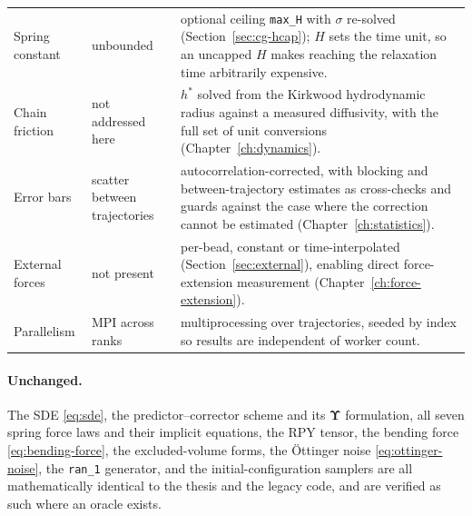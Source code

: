 \documentclass[11pt,a4paper]{report}
\newcommand{\code}[1]{\texttt{\seqsplitcode{#1}}}
\newcommand{\seqsplitcode}[1]{#1}
\begin{document}
\begin{longtable}{@{}p{}p{}p{}@{}}
\addlinespace
Spring constant
  & unbounded
  & optional ceiling \code{max\_H} with $\sigma$ re-solved
    (Section~\ref{sec:cg-hcap}); $H$ sets the time unit, so an uncapped $H$ makes
    reaching the relaxation time arbitrarily expensive. \\
\addlinespace
Chain friction
  & not addressed here
  & $h^{*}$ solved from the Kirkwood hydrodynamic radius against a measured
    diffusivity, with the full set of unit conversions
    (Chapter~\ref{ch:dynamics}). \\
\addlinespace
Error bars
  & scatter between trajectories
  & autocorrelation-corrected, with blocking and between-trajectory estimates as
    cross-checks and guards against the case where the correction cannot be
    estimated (Chapter~\ref{ch:statistics}). \\
\addlinespace
External forces
  & not present
  & per-bead, constant or time-interpolated (Section~\ref{sec:external}), enabling
    direct force-extension measurement (Chapter~\ref{ch:force-extension}). \\
\addlinespace
Parallelism
  & MPI across ranks
  & multiprocessing over trajectories, seeded by index so results are independent
    of worker count. \\
\bottomrule
\end{longtable}

\paragraph{Unchanged.} The SDE \eqref{eq:sde}, the predictor--corrector scheme
and its $\bm{\Upsilon}$ formulation, all seven spring force laws and their
implicit equations, the RPY tensor, the bending force
\eqref{eq:bending-force}, the excluded-volume forms, the \"{O}ttinger noise
\eqref{eq:ottinger-noise}, the \code{ran\_1} generator, and the
initial-configuration samplers are all mathematically identical to the thesis and
the legacy code, and are verified as such where an oracle exists.
\end{document}
